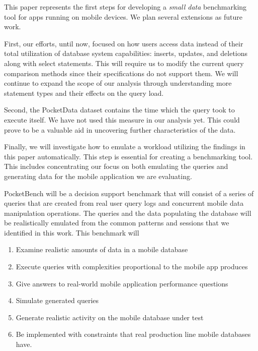 This paper represents the first steps for developing a \textit{small data} benchmarking tool for apps running on mobile devices. We plan several extensions as future work. 

First, our efforts, until now, focused on how users access data instead of their total utilization of database system capabilities: inserts, updates, and deletions along with select statements.
This will require us to modify the current query comparison methods since their specifications do not support them.
We will continue to expand the scope of our analysis through understanding more statement types and their effects on the query load.

Second, the PocketData dataset contains the time which the query took to execute itself. 
We have not used this measure in our analysis yet.
This could prove to be a valuable aid in uncovering further characteristics of the data.

Finally, we will investigate how to emulate a workload utilizing the findings in this paper automatically.
This step is essential for creating a benchmarking tool.
This includes concentrating our focus on both emulating the queries and generating data for the mobile application we are evaluating.

PocketBench will be a decision support benchmark that will consist of a series of queries that are created from real user query logs and concurrent mobile data manipulation operations. The queries and the data populating the database will be realistically emulated from the common patterns and sessions that we identified in this work. This benchmark will

\begin{enumerate}
  \item Examine realistic amounts of data in a mobile database
  \item Execute queries with complexities proportional to the mobile app produces
  \item Give answers to real-world mobile application performance questions
  \item Simulate generated queries
  \item Generate realistic activity on the mobile database under test
  \item Be implemented with constraints that real production line mobile databases have.
\end{enumerate}